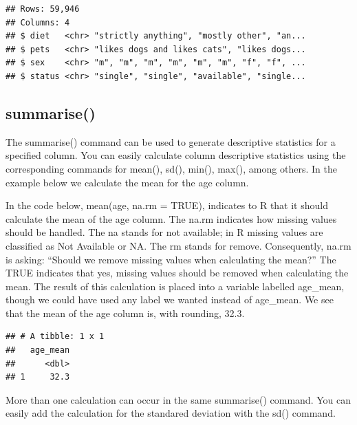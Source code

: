 \documentclass[
]{krantz}
\makeatletter
\newenvironment{Shaded}{\begin{snugshade}}{\end{snugshade}}
\newcommand{\DataTypeTok}[1]{\textcolor[rgb]{0.27,0.27,0.27}{#1}}
\newcommand{\KeywordTok}[1]{\textcolor[rgb]{0.27,0.27,0.27}{\textbf{#1}}}
\newcommand{\NormalTok}[1]{#1}
\newcommand{\OperatorTok}[1]{\textcolor[rgb]{0.43,0.43,0.43}{\textbf{#1}}}
\newcommand{\OtherTok}[1]{\textcolor[rgb]{0.37,0.37,0.37}{#1}}
\newcommand{\StringTok}[1]{\textcolor[rgb]{0.5,0.5,0.5}{#1}}
\newenvironment{kframe}{%
\medskip{}
\setlength{\fboxsep}{.8em}
 \def\at@end@of@kframe{}%
 \ifinner\ifhmode%
  \def\at@end@of@kframe{\end{minipage}}%
  \begin{minipage}{\columnwidth}%
 \fi\fi%
 \def\FrameCommand##1{\hskip\@totalleftmargin \hskip-\fboxsep
 \colorbox{shadecolor}{##1}\hskip-\fboxsep
     \hskip-\linewidth \hskip-\@totalleftmargin \hskip\columnwidth}%
 \MakeFramed {\advance\hsize-\width
   \@totalleftmargin\z@ \linewidth\hsize
   \@setminipage}}%
 {\par\unskip\endMakeFramed%
 \at@end@of@kframe}
\renewenvironment{Shaded}{\begin{kframe}}{\end{kframe}}
\makeatother
\begin{document}
\begin{verbatim}
## Rows: 59,946
## Columns: 4
## $ diet   <chr> "strictly anything", "mostly other", "an...
## $ pets   <chr> "likes dogs and likes cats", "likes dogs...
## $ sex    <chr> "m", "m", "m", "m", "m", "m", "f", "f", ...
## $ status <chr> "single", "single", "available", "single...
\end{verbatim}

\hypertarget{summarise}{%
\subsection{summarise()}\label{summarise}}

The summarise() command can be used to generate descriptive statistics for a specified column. You can easily calculate column descriptive statistics using the corresponding commands for mean(), sd(), min(), max(), among others. In the example below we calculate the mean for the age column.

In the code below, mean(age, na.rm = TRUE), indicates to R that it should calculate the mean of the age column. The na.rm indicates how missing values should be handled. The na stands for not available; in R missing values are classified as Not Available or NA. The rm stands for remove. Consequently, na.rm is asking: ``Should we remove missing values when calculating the mean?'' The TRUE indicates that yes, missing values should be removed when calculating the mean. The result of this calculation is placed into a variable labelled age\_mean, though we could have used any label we wanted instead of age\_mean. We see that the mean of the age column is, with rounding, 32.3.

\begin{Shaded}
\end{Shaded}

\begin{verbatim}
## # A tibble: 1 x 1
##   age_mean
##      <dbl>
## 1     32.3
\end{verbatim}

More than one calculation can occur in the same summarise() command. You can easily add the calculation for the standared deviation with the sd() command.
\end{document}
